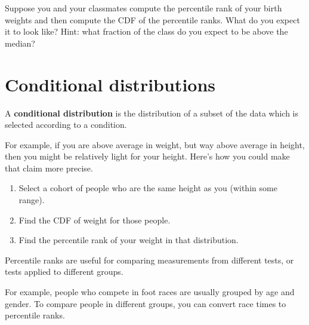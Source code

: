 \documentclass[12pt]{book}
\begin{document}
\begin{exercise}
Suppose you and your classmates compute the percentile rank of your
birth weights and then compute the CDF of the percentile ranks.  What do
you expect it to look like?  Hint: what fraction of the class do you
expect to be above the median?


\end{exercise}


\section{Conditional distributions}


A {\bf conditional distribution} is the distribution of a subset of
the data which is selected according to a condition.

For example, if you are above average in weight, but way above average
in height, then you might be relatively light for your height.  Here's
how you could make that claim more precise.

\begin{enumerate}


\item Select a cohort of people who are the same height as you (within
some range).

\item Find the CDF of weight for those people.

\item Find the percentile rank of your weight in that distribution.

\end{enumerate}

Percentile ranks are useful for comparing measurements from
different tests, or tests applied to different groups.


For example, people who compete in foot races are usually grouped by
age and gender.  To compare people in different groups, you can convert
race times to percentile ranks.
\end{document}
